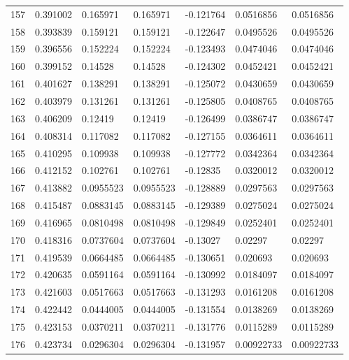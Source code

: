 \begin{longtable}{l|lll|lll}
 157 &  0.391002    & 0.165971    & 0.165971    & -0.121764    & 0.0516856   & 0.0516856   \\
 158 &  0.393839    & 0.159121    & 0.159121    & -0.122647    & 0.0495526   & 0.0495526   \\
 159 &  0.396556    & 0.152224    & 0.152224    & -0.123493    & 0.0474046   & 0.0474046   \\
 160 &  0.399152    & 0.14528     & 0.14528     & -0.124302    & 0.0452421   & 0.0452421   \\
 161 &  0.401627    & 0.138291    & 0.138291    & -0.125072    & 0.0430659   & 0.0430659   \\
 162 &  0.403979    & 0.131261    & 0.131261    & -0.125805    & 0.0408765   & 0.0408765   \\
 163 &  0.406209    & 0.12419     & 0.12419     & -0.126499    & 0.0386747   & 0.0386747   \\
 164 &  0.408314    & 0.117082    & 0.117082    & -0.127155    & 0.0364611   & 0.0364611   \\
 165 &  0.410295    & 0.109938    & 0.109938    & -0.127772    & 0.0342364   & 0.0342364   \\
 166 &  0.412152    & 0.102761    & 0.102761    & -0.12835     & 0.0320012   & 0.0320012   \\
 167 &  0.413882    & 0.0955523   & 0.0955523   & -0.128889    & 0.0297563   & 0.0297563   \\
 168 &  0.415487    & 0.0883145   & 0.0883145   & -0.129389    & 0.0275024   & 0.0275024   \\
 169 &  0.416965    & 0.0810498   & 0.0810498   & -0.129849    & 0.0252401   & 0.0252401   \\
 170 &  0.418316    & 0.0737604   & 0.0737604   & -0.13027     & 0.02297     & 0.02297     \\
 171 &  0.419539    & 0.0664485   & 0.0664485   & -0.130651    & 0.020693    & 0.020693    \\
 172 &  0.420635    & 0.0591164   & 0.0591164   & -0.130992    & 0.0184097   & 0.0184097   \\
 173 &  0.421603    & 0.0517663   & 0.0517663   & -0.131293    & 0.0161208   & 0.0161208   \\
 174 &  0.422442    & 0.0444005   & 0.0444005   & -0.131554    & 0.0138269   & 0.0138269   \\
 175 &  0.423153    & 0.0370211   & 0.0370211   & -0.131776    & 0.0115289   & 0.0115289   \\
 176 &  0.423734    & 0.0296304   & 0.0296304   & -0.131957    & 0.00922733  & 0.00922733  \\

\end{longtable}
